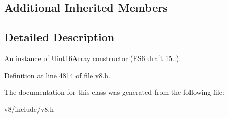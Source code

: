\subsection*{Additional Inherited Members}


\subsection{Detailed Description}
An instance of \mbox{\hyperlink{classv8_1_1Uint16Array}{Uint16\+Array}} constructor (E\+S6 draft 15..). 

Definition at line 4814 of file v8.\+h.



The documentation for this class was generated from the following file\+:\begin{DoxyCompactItemize}
\item 
v8/include/v8.\+h\end{DoxyCompactItemize}
